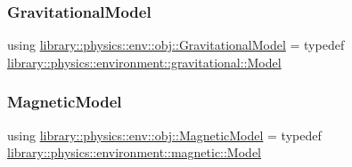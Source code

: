\subsubsection{\texorpdfstring{Gravitational\+Model}{GravitationalModel}}
{\footnotesize\ttfamily using \hyperlink{namespacelibrary_1_1physics_1_1env_1_1obj_ade509c84a4970a3420c03c058ada152a}{library\+::physics\+::env\+::obj\+::\+Gravitational\+Model} = typedef \hyperlink{classlibrary_1_1physics_1_1environment_1_1gravitational_1_1_model}{library\+::physics\+::environment\+::gravitational\+::\+Model}}

\mbox{\label{namespacelibrary_1_1physics_1_1env_1_1obj_a86d4e595a77f8bd5ed03ecd32c3a80de}} 
\subsubsection{\texorpdfstring{Magnetic\+Model}{MagneticModel}}
{\footnotesize\ttfamily using \hyperlink{namespacelibrary_1_1physics_1_1env_1_1obj_a86d4e595a77f8bd5ed03ecd32c3a80de}{library\+::physics\+::env\+::obj\+::\+Magnetic\+Model} = typedef \hyperlink{classlibrary_1_1physics_1_1environment_1_1magnetic_1_1_model}{library\+::physics\+::environment\+::magnetic\+::\+Model}}

